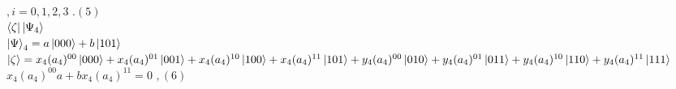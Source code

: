 \documentclass[a4paper,12pt]{article}
\begin{document}
  $   ,  i=0,1,2,3  $            $ .     (5) $ 
  \leavevmode
  \newline \\
  $\bra{\zeta}\ket{\Psi_{4}}$
  \newline \\
  $\ket{\Psi}_{4}=a\ket{000}+b\ket{101}$
  \newline \\
  $\ket{\zeta}=x_{4}(a_{4})^{00}\ket{000}+x_{4}(a_{4})^{01}\ket{001}+x_{4}(a_{4})^{10}\ket{100}+x_{4}(a_{4})^{11}\ket{101}+y_{4}(a_{4})^{00}\ket{010}+y_{4}(a_{4})^{01}\ket{011}+y_{4}(a_{4})^{10}\ket{110}+y_{4}(a_{4})^{11}\ket{111}$
  \newline \\
  $x_{4}(a_{4})^{00}a+bx_{4}(a_{4})^{11}=0$ $
  ,  (6)$
  \newline \\
  
\end{document}
